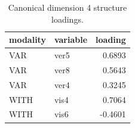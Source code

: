\begin{table}
\caption{Canonical dimension 4 structure loadings.}
\label{tab:cca_dimension_4_loadings}
\begin{tabular}{llr}
\toprule
modality & variable & loading \\
\midrule
VAR & ver5 & 0.6893 \\
VAR & ver8 & 0.5643 \\
VAR & ver4 & 0.3245 \\
WITH & vis4 & 0.7064 \\
WITH & vis6 & -0.4601 \\
\bottomrule
\end{tabular}
\end{table}
